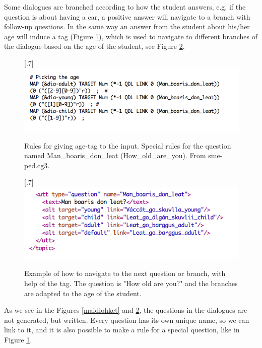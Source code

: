 \documentclass[a4paper,12pt]{article}
\begin{document}
Some dialogues are branched according to how the student answers, e.g. if the question is about having a car, a positive answer will navigate to a branch with follow-up questions. In the same way an answer from the student about his/her age will induce a tag (Figure \ref{age}), which is used to navigate to different branches of the dialogue based on the age of the student, see Figure \ref{branch}.


\begin{figure}[htbp]
\begin{center}
\scalebox{.7}[.7]{\includegraphics{img/picking_age.png}}\\
\caption{Rules for giving age-tag to the input. Special rules for the question named Man\_boaris\_don\_leat (How\_old\_are\_you). From sme-ped.cg3.}
\label{age}
\end{center}
\end{figure}


\begin{figure}[htbp]
\begin{center}
\scalebox{.7}[.7]{\includegraphics{img/Man_boaris.png}}\\
\caption{Example of how to navigate to the next question or branch, with help of the tag.  The question is "How old are you?" and the branches are adapted to the age of the student.}
\label{branch}
\end{center}
\end{figure}

As we see in the Figures \ref{maidlohket} and \ref{branch}, the questions in the dialogues are not generated, but written. Every question has its own unique name, so we can link to it, and it is also possible to make a rule for a special question, like in Figure \ref{age}.  
\end{document}
